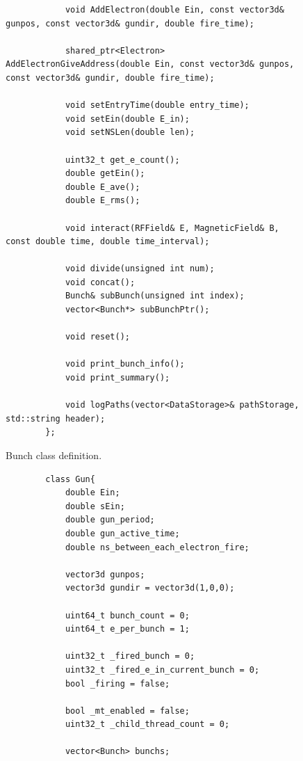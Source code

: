 \documentclass[a4paper,oneside,12pt]{report}
\numberwithin{equation}{chapter}
\begin{document}
{\begin{figure}[H]
\begin{verbatim}
            void AddElectron(double Ein, const vector3d& gunpos, const vector3d& gundir, double fire_time);

            shared_ptr<Electron> AddElectronGiveAddress(double Ein, const vector3d& gunpos, const vector3d& gundir, double fire_time);

            void setEntryTime(double entry_time);
            void setEin(double E_in);
            void setNSLen(double len);

            uint32_t get_e_count();
            double getEin();
            double E_ave();
            double E_rms();

            void interact(RFField& E, MagneticField& B, const double time, double time_interval);

            void divide(unsigned int num);
            void concat();
            Bunch& subBunch(unsigned int index);
            vector<Bunch*> subBunchPtr();

            void reset();

            void print_bunch_info();
            void print_summary();

            void logPaths(vector<DataStorage>& pathStorage, std::string header);
        };
    \end{verbatim}
    \vspace{20pt}
    \caption{Bunch class definition.}
    \label{fig:bunch_class}
\end{figure}

\begin{figure}[H]
    \centering
    \begin{verbatim}
        class Gun{
            double Ein;
            double sEin;
            double gun_period;
            double gun_active_time;
            double ns_between_each_electron_fire;

            vector3d gunpos;
            vector3d gundir = vector3d(1,0,0);

            uint64_t bunch_count = 0;
            uint64_t e_per_bunch = 1;

            uint32_t _fired_bunch = 0;
            uint32_t _fired_e_in_current_bunch = 0;
            bool _firing = false;

            bool _mt_enabled = false;
            uint32_t _child_thread_count = 0;

            vector<Bunch> bunchs;


\end{verbatim}
\end{figure}}
\end{document}
